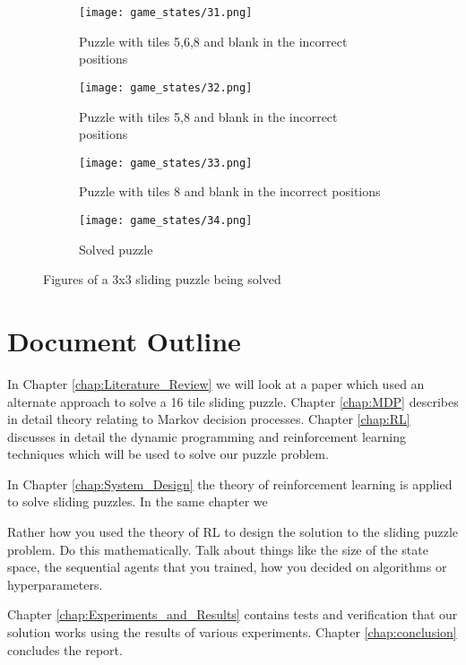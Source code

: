 \begin{figure}[!htb]
	\centering
	\begin{subfigure}{.4\textwidth}
		\centering
		\texttt{[image: game\_states/31.png]}
		\caption{Puzzle with tiles 5,6,8 and blank in the incorrect positions}
		\label{fig:sfig1}
	\end{subfigure}%
	\begin{subfigure}{.4\textwidth}
		\centering
		\texttt{[image: game\_states/32.png]}
		\caption{Puzzle with tiles 5,8 and blank in the incorrect positions}
		\label{fig:sfig2}
	\end{subfigure}
	\begin{subfigure}{.4\textwidth}
		\centering
		\texttt{[image: game\_states/33.png]}
		\caption{Puzzle with tiles 8 and blank in the incorrect positions}
		\label{fig:sfig3}
	\end{subfigure}
	\begin{subfigure}{.4\textwidth}
		\centering
		\texttt{[image: game\_states/34.png]}
		\caption{Solved puzzle}
		\label{fig:sfig4}
	\end{subfigure}
	\caption{Figures of a 3x3 sliding puzzle being solved}
	\label{fig:sliding_puzzle_figs}
\end{figure}

\section{Document Outline} 
In Chapter \ref{chap:Literature_Review} we will look at a paper which used an alternate approach to solve a 16 tile sliding puzzle.
Chapter \ref{chap:MDP} describes in detail theory relating to Markov decision processes.
Chapter \ref{chap:RL} discusses in detail the dynamic programming and reinforcement learning techniques which will be used to solve our puzzle problem.

In Chapter \ref{chap:System_Design} the theory of reinforcement learning is applied to solve sliding puzzles. In the same chapter we 

{\color{red}Rather how you used the theory of RL to design the solution to the sliding puzzle problem. Do this mathematically. Talk about things like the size of the state space, the sequential agents that you trained, how you decided on algorithms or hyperparameters.}

Chapter \ref{chap:Experiments_and_Results} contains tests and verification that our solution works using the results of various experiments.
Chapter \ref{chap:conclusion} concludes the report.